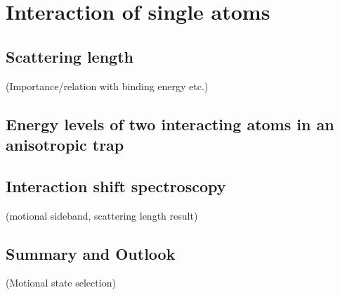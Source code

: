 
\chapter{Interaction of single atoms}

\section{Scattering length}
(Importance/relation with binding energy etc.)

\section{Energy levels of two interacting atoms in an anisotropic trap}

\section{Interaction shift spectroscopy}
(motional sideband, scattering length result)

\section{Summary and Outlook}
(Motional state selection)

